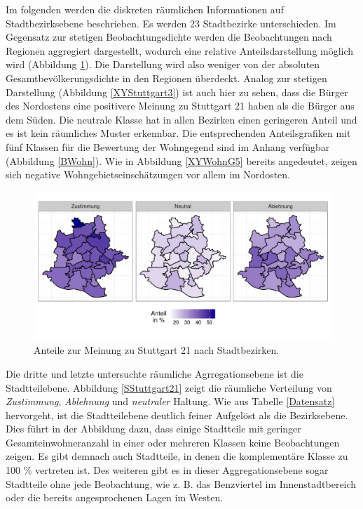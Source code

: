\documentclass{Vorlage}
\begin{document}
Im folgenden werden die diskreten räumlichen Informationen auf Stadtbezirksebene beschrieben. Es werden 23 Stadtbezirke 
unterschieden. Im Gegensatz zur stetigen Beobachtungsdichte werden die Beobachtungen nach Regionen aggregiert 
dargestellt, wodurch eine relative Anteilsdarstellung möglich wird (Abbildung \ref{BStuttgart21}). Die Darstellung wird 
also weniger von der absoluten Gesamtbevölkerungsdichte in den Regionen überdeckt. Analog zur stetigen Darstellung 
(Abbildung \ref{XYStuttgart3}) ist auch hier zu sehen, dass die Bürger des Nordostens eine positivere Meinung zu 
Stuttgart 21 haben als die Bürger aus dem Süden. Die neutrale Klasse hat in allen Bezirken einen geringeren Anteil und es ist kein räumliches Muster erkennbar. Die entsprechenden Anteilsgrafiken mit fünf Klassen für die Bewertung der Wohngegend sind im Anhang verfügbar (Abbildung 
\ref{BWohn}). Wie in Abbildung \ref{XYWohnG5} bereits angedeutet, zeigen sich negative Wohngebietseinschätzungen vor 
allem im Nordosten.

\begin{figure}[h]
 \begin{center}
 \includegraphics[scale=0.8]{Pictures/BStuttgart3}
 \caption{Anteile zur Meinung zu Stuttgart 21 nach Stadtbezirken.}
 \label{BStuttgart21}
 \end{center}
\end{figure}

Die dritte und letzte untersuchte räumliche Agrregationsebene ist die Stadtteilebene. Abbildung \ref{SStuttgart21} 
zeigt die räumliche Verteilung von \textit{Zustimmung}, \textit{Ablehnung} und \textit{neutraler} Haltung. Wie aus 
Tabelle \ref{Datensatz} hervorgeht, ist die Stadtteilebene deutlich feiner Aufgelöst als die Bezirksebene. Dies führt in 
der Abbildung dazu, dass einige Stadtteile mit geringer Gesamteinwohneranzahl in einer oder mehreren Klassen keine 
Beobachtungen zeigen. Es gibt demnach auch Stadtteile, in denen die komplementäre Klasse zu 100 \% vertreten ist. Des 
weiteren gibt es in dieser Aggregationsebene sogar Stadtteile ohne jede Beobachtung, wie z. B. das Benzviertel im 
Innenstadtbereich oder die bereits angesprochenen Lagen im Westen.
\end{document}
